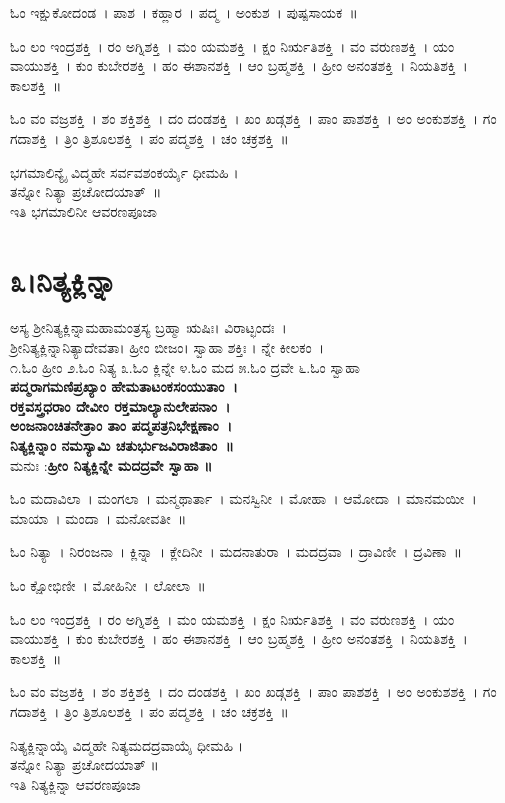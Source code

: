 ಓಂ ಇಕ್ಷುಕೋದಂಡ~। ಪಾಶ~। ಕಹ್ಲಾರ~। ಪದ್ಮ~। ಅಂಕುಶ~। ಪುಷ್ಪಸಾಯಕ~॥ 

ಓಂ ಲಂ ಇಂದ್ರಶಕ್ತಿ~। ರಂ ಅಗ್ನಿಶಕ್ತಿ~। ಮಂ ಯಮಶಕ್ತಿ~। ಕ್ಷಂ ನಿರ್ಋತಿಶಕ್ತಿ~। ವಂ ವರುಣಶಕ್ತಿ~। ಯಂ ವಾಯುಶಕ್ತಿ~। ಕುಂ ಕುಬೇರಶಕ್ತಿ~। ಹಂ ಈಶಾನಶಕ್ತಿ~। ಆಂ ಬ್ರಹ್ಮಶಕ್ತಿ~। ಹ್ರೀಂ ಅನಂತಶಕ್ತಿ~। ನಿಯತಿಶಕ್ತಿ~। ಕಾಲಶಕ್ತಿ~॥ 

ಓಂ ವಂ ವಜ್ರಶಕ್ತಿ~। ಶಂ ಶಕ್ತಿಶಕ್ತಿ~। ದಂ ದಂಡಶಕ್ತಿ~। ಖಂ ಖಡ್ಗಶಕ್ತಿ~। ಪಾಂ ಪಾಶಶಕ್ತಿ~। ಅಂ ಅಂಕುಶಶಕ್ತಿ~। ಗಂ ಗದಾಶಕ್ತಿ~। ತ್ರಿಂ ತ್ರಿಶೂಲಶಕ್ತಿ~। ಪಂ ಪದ್ಮಶಕ್ತಿ~। ಚಂ ಚಕ್ರಶಕ್ತಿ~॥ 

ಭಗಮಾಲಿನ್ಯೈ ವಿದ್ಮಹೇ ಸರ್ವವಶಂಕರ್ಯೈ ಧೀಮಹಿ ।\\ತನ್ನೋ ನಿತ್ಯಾ ಪ್ರಚೋದಯಾತ್~॥\\
ಇತಿ ಭಗಮಾಲಿನೀ ಆವರಣಪೂಜಾ
\section{೩।ನಿತ್ಯಕ್ಲಿನ್ನಾ}
ಅಸ್ಯ ಶ್ರೀನಿತ್ಯಕ್ಲಿನ್ನಾಮಹಾಮಂತ್ರಸ್ಯ ಬ್ರಹ್ಮಾ ಋಷಿಃ। ವಿರಾಟ್ಛಂದಃ~।\\ ಶ್ರೀನಿತ್ಯಕ್ಲಿನ್ನಾನಿತ್ಯಾದೇವತಾ। ಹ್ರೀಂ ಬೀಜಂ। ಸ್ವಾಹಾ ಶಕ್ತಿಃ । ನ್ನೇ ಕೀಲಕಂ~।\\
೧.ಓಂ ಹ್ರೀಂ ೨.ಓಂ ನಿತ್ಯ ೩.ಓಂ ಕ್ಲಿನ್ನೇ ೪.ಓಂ ಮದ ೫.ಓಂ ದ್ರವೇ ೬.ಓಂ ಸ್ವಾಹಾ\\
{\bfseries ಪದ್ಮರಾಗಮಣಿಪ್ರಖ್ಯಾಂ ಹೇಮತಾಟಂಕಸಂಯುತಾಂ~।\\
ರಕ್ತವಸ್ತ್ರಧರಾಂ ದೇವೀಂ ರಕ್ತಮಾಲ್ಯಾನುಲೇಪನಾಂ~।\\
ಅಂಜನಾಂಚಿತನೇತ್ರಾಂ ತಾಂ ಪದ್ಮಪತ್ರನಿಭೇಕ್ಷಣಾಂ~।\\
ನಿತ್ಯಕ್ಲಿನ್ನಾಂ ನಮಸ್ಯಾಮಿ ಚತುರ್ಭುಜವಿರಾಜಿತಾಂ~॥\\}
ಮನುಃ :{\bfseries ಹ್ರೀಂ ನಿತ್ಯಕ್ಲಿನ್ನೇ ಮದದ್ರವೇ ಸ್ವಾಹಾ ॥}

ಓಂ ಮದಾವಿಲಾ~। ಮಂಗಲಾ~। ಮನ್ಮಥಾರ್ತಾ~। ಮನಸ್ವಿನೀ~। ಮೋಹಾ~। ಆಮೋದಾ~। ಮಾನಮಯೀ~। ಮಾಯಾ~। ಮಂದಾ~। ಮನೋವತೀ~॥ 

ಓಂ ನಿತ್ಯಾ~। ನಿರಂಜನಾ~। ಕ್ಲಿನ್ನಾ~। ಕ್ಲೇದಿನೀ~। ಮದನಾತುರಾ~। ಮದದ್ರವಾ~। ದ್ರಾವಿಣೀ~। ದ್ರವಿಣಾ~॥ 

ಓಂ ಕ್ಷೋಭಿಣೀ~। ಮೋಹಿನೀ~। ಲೋಲಾ~॥

ಓಂ ಲಂ ಇಂದ್ರಶಕ್ತಿ~। ರಂ ಅಗ್ನಿಶಕ್ತಿ~। ಮಂ ಯಮಶಕ್ತಿ~। ಕ್ಷಂ ನಿರ್ಋತಿಶಕ್ತಿ~। ವಂ ವರುಣಶಕ್ತಿ~। ಯಂ ವಾಯುಶಕ್ತಿ~। ಕುಂ ಕುಬೇರಶಕ್ತಿ~। ಹಂ ಈಶಾನಶಕ್ತಿ~। ಆಂ ಬ್ರಹ್ಮಶಕ್ತಿ~। ಹ್ರೀಂ ಅನಂತಶಕ್ತಿ~। ನಿಯತಿಶಕ್ತಿ~। ಕಾಲಶಕ್ತಿ~॥ 

ಓಂ ವಂ ವಜ್ರಶಕ್ತಿ~। ಶಂ ಶಕ್ತಿಶಕ್ತಿ~। ದಂ ದಂಡಶಕ್ತಿ~। ಖಂ ಖಡ್ಗಶಕ್ತಿ~। ಪಾಂ ಪಾಶಶಕ್ತಿ~। ಅಂ ಅಂಕುಶಶಕ್ತಿ~। ಗಂ ಗದಾಶಕ್ತಿ~। ತ್ರಿಂ ತ್ರಿಶೂಲಶಕ್ತಿ~। ಪಂ ಪದ್ಮಶಕ್ತಿ~। ಚಂ ಚಕ್ರಶಕ್ತಿ~॥ 

ನಿತ್ಯಕ್ಲಿನ್ನಾಯೈ ವಿದ್ಮಹೇ ನಿತ್ಯಮದದ್ರವಾಯೈ ಧೀಮಹಿ ।\\ತನ್ನೋ ನಿತ್ಯಾ ಪ್ರಚೋದಯಾತ್ ॥\\
ಇತಿ ನಿತ್ಯಕ್ಲಿನ್ನಾ ಆವರಣಪೂಜಾ
